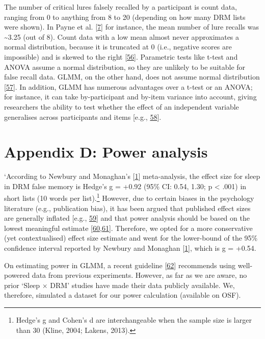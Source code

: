 \documentclass[
]{article}
\begin{document}
The number of critical lures falsely recalled by a participant is count data, ranging from 0 to anything from 8 to 20 (depending on how many DRM lists were shown). In Payne et al. {[}\protect\hyperlink{ref-payne2009a}{7}{]} for instance, the mean number of lure recalls was \textasciitilde3.25 (out of 8). Count data with a low mean almost never approximates a normal distribution, because it is truncated at 0 (i.e., negative scores are impossible) and is skewed to the right {[}\protect\hyperlink{ref-herbison-a}{56}{]}. Parametric tests like t-test and ANOVA assume a normal distribution, so they are unlikely to be suitable for false recall data. GLMM, on the other hand, does not assume normal distribution {[}\protect\hyperlink{ref-lo2015a}{57}{]}. In addition, GLMM has numerous advantages over a t-test or an ANOVA; for instance, it can take by-participant and by-item variance into account, giving researchers the ability to test whether the effect of an independent variable generalises across participants and items {[}e.g., \protect\hyperlink{ref-brysbaert2018a}{58}{]}.

\hypertarget{appendix-d-power-analysis}{%
\section*{Appendix D: Power analysis}\label{appendix-d-power-analysis}}

`According to Newbury and Monaghan's {[}\protect\hyperlink{ref-newbury2019a}{1}{]} meta-analysis, the effect size for sleep in DRM false memory is Hedge's g = +0.92 (95\% CI: 0.54, 1.30; p \textless{} .001) in short lists (10 words per list).\footnote{Hedge’s g and Cohen’s d are interchangeable when the sample size is larger than 30 (Kline, 2004; Lakens, 2013).} However, due to certain biases in the psychology literature (e.g., publication bias), it has been argued that published effect sizes are generally inflated {[}e.g., \protect\hyperlink{ref-schaefer2019a}{59}{]} and that power analysis should be based on the lowest meaningful estimate {[}\protect\hyperlink{ref-albers2018a}{60},\protect\hyperlink{ref-cortex2013a}{61}{]}. Therefore, we opted for a more conservative (yet contextualised) effect size estimate and went for the lower-bound of the 95\% confidence interval reported by Newbury and Monaghan {[}\protect\hyperlink{ref-newbury2019a}{1}{]}, which is g = +0.54.

On estimating power in GLMM, a recent guideline {[}\protect\hyperlink{ref-kumle2021a}{62}{]} recommends using well-powered data from previous experiments. However, as far as we are aware, no prior `Sleep \(\times\) DRM' studies have made their data publicly available. We, therefore, simulated a dataset for our power calculation (available on OSF).
\end{document}
